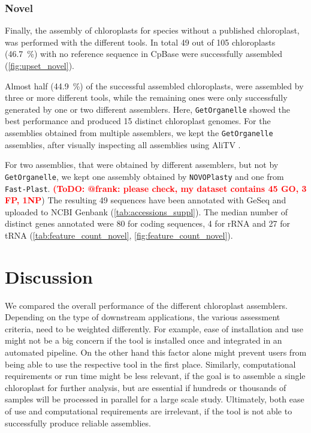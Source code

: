 \documentclass{bmcart}
\newcommand{\todo}[1]{\textcolor{red}{\bfseries(ToDO: #1})}
\newcommand{\formatprogramnames}[1]{\texttt{#1}}
\newcommand{\fp}{\formatprogramnames{Fast-Plast}}
\newcommand{\np}{\formatprogramnames{NOVOPlasty}}
\newcommand{\go}{\formatprogramnames{GetOrganelle}}
\begin{document}
\subsubsection*{Novel}
Finally, the assembly of chloroplasts for species without a published chloroplast, was performed with the different tools.
In total \num{49} out of \num{105} chloroplasts (\SI{46.7}{\percent}) with no reference sequence in CpBase were successfully assembled (\cref{fig:upset_novel}).

Almost half (\SI{44.9}{\percent}) of the successful assembled chloroplasts, were assembled by three or more different tools, while the remaining ones were only successfully generated by one or two different assemblers. 
Here, \go{} showed the best performance and produced 15 distinct chloroplast genomes. 
For the assemblies obtained from multiple assemblers, we kept the \go{} assemblies,
after visually inspecting all assemblies using AliTV \cite{alitv}.

For two assemblies, that were obtained by different assemblers, but not by \go{}, we kept one assembly obtained by \np{} and one from \fp{}. \todo{@frank: please check, my dataset contains 45 GO, 3 FP, 1NP}
The resulting \num{49} sequences have been annotated with GeSeq \cite{geseq} and uploaded to NCBI Genbank (\cref{tab:accessions_suppl}).
The median number of distinct genes annotated were 80 for coding sequences, 4 for rRNA and 27 for tRNA (\cref{tab:feature_count_novel}, \cref{fig:feature_count_novel}). 

\section*{Discussion}
We compared the overall performance of the different chloroplast assemblers.
Depending on the type of downstream applications, the various assessment criteria, need to be weighted differently.
For example, ease of installation and use might not be a big concern if the tool is installed once and integrated in an automated pipeline.
On the other hand this factor alone might prevent users from being able to use the respective tool in the first place.
Similarly, computational requirements or run time might be less relevant, if the goal is to assemble a single chloroplast for further analysis, but are essential if hundreds or thousands of samples will be processed in parallel for a large scale study.
Ultimately, both ease of use and computational requirements are irrelevant, if the tool is not able to successfully produce reliable assemblies.
\end{document}
